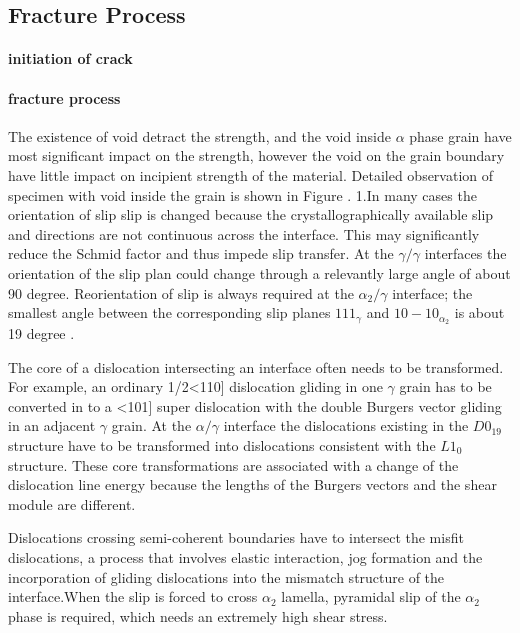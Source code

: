 \documentclass[times]{elsarticle}
\begin{document}
\subsection{Fracture Process}
\paragraph{initiation of crack}
\paragraph{fracture process}
The existence of void detract the strength, and the void inside $\alpha$ phase grain have most significant  impact on the strength, however the void on the grain boundary have little impact on incipient strength of the material. Detailed observation of specimen with void inside the grain is shown in Figure \cite{}.
1.In many cases the orientation of slip slip is changed because the crystallographically available slip and directions are not continuous across the interface. This may significantly reduce the Schmid factor and thus impede slip transfer. At the $\gamma/\gamma$ interfaces the orientation of the slip plan could change through a relevantly large angle of about 90 degree. Reorientation of slip is always required at the $\alpha_{2}/\gamma$ interface; the smallest angle between the corresponding slip planes ${1 1 1 }_{\gamma}$ and ${ 1 0 -1 0}_{\alpha_2}$ is about 19 degree \cite{}.

The core of  a dislocation intersecting an interface often needs to be transformed. For example, an ordinary 1/2<110] dislocation gliding in one $\gamma$ grain has to be converted in to a <101] super dislocation with the double Burgers vector gliding in an adjacent $\gamma$ grain. At the $\alpha/\gamma$ interface the dislocations existing in the $D0_{19}$ structure have to be transformed into dislocations consistent with the $L1_0$structure. These core transformations are associated with a change of the dislocation line energy because the lengths of the Burgers vectors and the shear module are different.
 
Dislocations crossing semi-coherent boundaries have to intersect the misfit dislocations, a process that involves elastic interaction, jog formation and the incorporation of gliding dislocations into the mismatch structure of the interface.When the slip is forced to cross $\alpha_2$ lamella, pyramidal slip of the $\alpha_2$ phase is required, which needs an extremely high shear stress.


\end{document}
